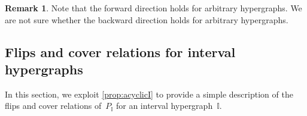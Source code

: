 \documentclass{amsart}
\newtheorem{proposition}[theorem]{Proposition}
\theoremstyle{definition}
\newtheorem{remark}[theorem]{Remark}
\newcommand{\cal}[1]{\mathcal{#1}} %
\newcommand{\ssm}{\smallsetminus} %
\newcommand{\eqdef}{\mbox{\,\raisebox{0.2ex}{\scriptsize\ensuremath{\mathrm:}}\ensuremath{=}\,}} %
\newcommand{\ie}{\textit{i.e.}~} %
\newcommand{\II}{\mathbb I} %
\newcommand{\cX}{\cal{X}}
\newcommand{\cY}{\cal{Y}}
\begin{document}
\begin{remark}
Note that the forward direction holds for arbitrary hypergraphs.
We are not sure whether the backward direction holds for arbitrary hypergraphs.
\end{remark}


\subsection{Flips and cover relations for interval hypergraphs}  
\label{subsec:cover}

In this section, we exploit \cref{prop:acyclicI} to provide a simple description of the flips and cover relations of~$P_\II$ for an interval hypergraph~$\II$.

%
\end{document}
